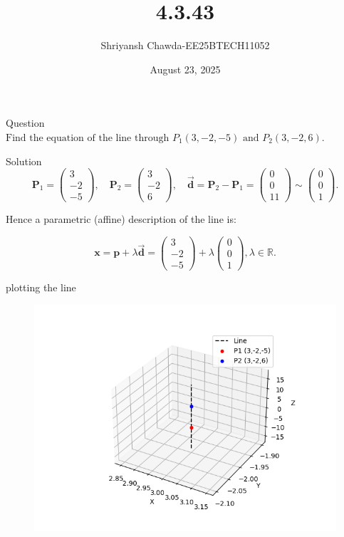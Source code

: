 \documentclass{beamer}
\title{4.3.43}
\author{Shriyansh Chawda-EE25BTECH11052}
\date{August 23, 2025}
\begin{document}
	

		\frame{\titlepage}
	
	
	

	\begin{frame}{Question} 
$\text{Find the equation of the line through }P_1(3,-2,-5)\text{ and }P_2(3,-2,6).$
	\end{frame}
	
	

	\begin{frame}{Solution}
\[
\mathbf{P}_1 = 
\begin{pmatrix}
	3 \\ -2 \\ -5
\end{pmatrix},
\quad
\mathbf{P}_2 = 
\begin{pmatrix}
	3 \\ -2 \\ 6
\end{pmatrix},
\quad
\vec{\mathbf{d}} = \mathbf{P}_2 - \mathbf{P}_1 = 
\begin{pmatrix}
	0 \\ 0 \\ 11
\end{pmatrix}
\sim
\begin{pmatrix}
	0 \\ 0 \\ 1
\end{pmatrix}.
\]

Hence a parametric (affine) description of the line is:

\[
\mathbf{x} = \mathbf{p} + \lambda \vec{\mathbf{d}} =
\begin{pmatrix}
	3 \\ -2 \\ -5
\end{pmatrix}
+ \lambda
\begin{pmatrix}
	0 \\ 0 \\ 1
\end{pmatrix},  \lambda \in \mathbb{R}.
\]
\end{frame}

\begin{frame}{plotting the line}

\begin{figure}[H]
	\centering
	\includegraphics[width=1.0\linewidth]{figs/line3d}
	\label{fig:line3d}
\end{figure}

	
\end{frame}
\end{document}
